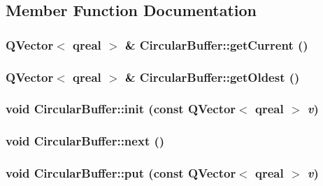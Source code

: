 \subsection{Member Function Documentation}
\hypertarget{class_circular_buffer_a7c4096d1efc8e1cdc9f5be5be3c349e1}{
\subsubsection[{getCurrent}]{\setlength{\rightskip}{0pt plus 5cm}QVector$<$ qreal $>$ \& CircularBuffer::getCurrent ()}}
\label{class_circular_buffer_a7c4096d1efc8e1cdc9f5be5be3c349e1}
\hypertarget{class_circular_buffer_a9f6b11ef3601e32beac4d5525211ce52}{
\subsubsection[{getOldest}]{\setlength{\rightskip}{0pt plus 5cm}QVector$<$ qreal $>$ \& CircularBuffer::getOldest ()}}
\label{class_circular_buffer_a9f6b11ef3601e32beac4d5525211ce52}
\hypertarget{class_circular_buffer_aa79025f00e3b84355eb037a5755b2700}{
\subsubsection[{init}]{\setlength{\rightskip}{0pt plus 5cm}void CircularBuffer::init (const QVector$<$ qreal $>$ {\em v})}}
\label{class_circular_buffer_aa79025f00e3b84355eb037a5755b2700}
\hypertarget{class_circular_buffer_aa90e1d3b23077235958bfc60e7b02805}{
\subsubsection[{next}]{\setlength{\rightskip}{0pt plus 5cm}void CircularBuffer::next ()}}
\label{class_circular_buffer_aa90e1d3b23077235958bfc60e7b02805}
\hypertarget{class_circular_buffer_a279c6c54d6a7f1f94d3d5311dc8a631f}{
\subsubsection[{put}]{\setlength{\rightskip}{0pt plus 5cm}void CircularBuffer::put (const QVector$<$ qreal $>$ {\em v})}}
